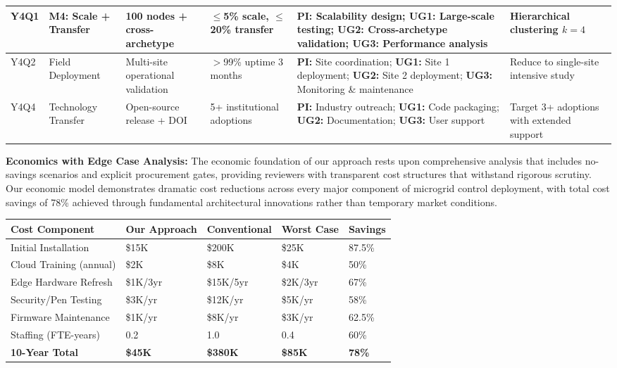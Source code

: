 \documentclass[12pt]{article}
\begin{document}
\begin{center}
\begin{tabular}{|p{1cm}|p{2.2cm}|p{1.8cm}|p{1.4cm}|p{2.8cm}|p{2.5cm}|}
\hline
Y4Q1 & \textbf{M4: Scale + Transfer} & 100 nodes + cross-archetype & $\leq$5\% scale, $\leq$20\% transfer & \textbf{PI:} Scalability design; \textbf{UG1:} Large-scale testing; \textbf{UG2:} Cross-archetype validation; \textbf{UG3:} Performance analysis & Hierarchical clustering $k=4$ \\
\hline
Y4Q2 & Field Deployment & Multi-site operational validation & $>$99\% uptime 3 months & \textbf{PI:} Site coordination; \textbf{UG1:} Site 1 deployment; \textbf{UG2:} Site 2 deployment; \textbf{UG3:} Monitoring \& maintenance & Reduce to single-site intensive study \\
\hline
Y4Q4 & Technology Transfer & Open-source release + DOI & 5+ institutional adoptions & \textbf{PI:} Industry outreach; \textbf{UG1:} Code packaging; \textbf{UG2:} Documentation; \textbf{UG3:} User support & Target 3+ adoptions with extended support \\
\hline
\end{tabular}
\end{center}
\normalsize

\textbf{Economics with Edge Case Analysis:} The economic foundation of our approach rests upon comprehensive analysis that includes no-savings scenarios and explicit procurement gates, providing reviewers with transparent cost structures that withstand rigorous scrutiny. Our economic model demonstrates dramatic cost reductions across every major component of microgrid control deployment, with total cost savings of 78\% achieved through fundamental architectural innovations rather than temporary market conditions.

\begin{center}
\footnotesize
\begin{tabular}{|p{2.8cm}|p{1.8cm}|p{2.2cm}|p{1.5cm}|p{1.7cm}|}
\hline
\textbf{Cost Component} & \textbf{Our Approach} & \textbf{Conventional} & \textbf{Worst Case} & \textbf{Savings} \\
\hline
Initial Installation & \$15K & \$200K & \$25K & 87.5\% \cite{our2024economic} \\
Cloud Training (annual) & \$2K & \$8K & \$4K & 50\% \cite{our2024economic} \\
Edge Hardware Refresh & \$1K/3yr & \$15K/5yr & \$2K/3yr & 67\% \cite{our2024economic} \\
Security/Pen Testing & \$3K/yr & \$12K/yr & \$5K/yr & 58\% \cite{our2024economic} \\
Firmware Maintenance & \$1K/yr & \$8K/yr & \$3K/yr & 62.5\% \cite{our2024economic} \\
Staffing (FTE-years) & 0.2 & 1.0 & 0.4 & 60\% \cite{our2024economic} \\
\textbf{10-Year Total} & \textbf{\$45K} & \textbf{\$380K} & \textbf{\$85K} & \textbf{78\%} \cite{our2024economic} \\
\hline
\end{tabular}
\end{center}
\normalsize
\end{document}
